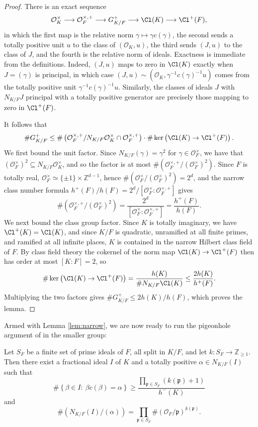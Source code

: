 \begin{proof}
There is an exact sequence
\[
   \mathcal{O}_K^\times\longrightarrow \mathcal{O}_F^{\times,+}\longrightarrow G_{K/F}^+
   \longrightarrow \Cl(K)\longrightarrow \Cl^+(F),
\]
in which the first map is the relative norm $\gamma\mapsto\gamma c(\gamma)$, the second sends a totally positive unit $u$ to the class of $(\mathcal{O}_K,u)$, the third sends $(J,u)$ to the class of $J$, and the fourth is the relative norm of ideals.  Exactness is immediate from the definitions.  Indeed, $(J,u)$ maps to zero in $\Cl(K)$ exactly when $J=(\gamma)$ is principal, in which case $(J,u)\sim(\mathcal{O}_K,\gamma^{-1}c(\gamma)^{-1}u)$ comes from the totally positive unit $\gamma^{-1}c(\gamma)^{-1}u$.  Similarly, the classes of ideals $J$ with $N_{K/F}J$ principal with a totally positive generator are precisely those mapping to zero in $\Cl^+(F)$.

It follows that
\[
   \#G^+_{K/F}
   \leq
   \#\left(\mathcal{O}_F^{\times,+}/N_{K/F}\mathcal{O}_K^\times\cap\mathcal{O}_F^{\times,+}\right)
   \cdot
   \#\ker\left(\Cl(K)\to\Cl^+(F)\right).
\]
We first bound the unit factor.  Since $N_{K/F}(\gamma)=\gamma^2$ for $\gamma\in\mathcal{O}_F^\times$, we have that $(\mathcal{O}_F^\times)^2\subseteq N_{K/F}\mathcal{O}_K^\times$, and so the factor is at most $\#\left(\mathcal{O}_F^{\times,+}/(\mathcal{O}_F^\times)^2\right)$.  Since $F$ is totally real, $\mathcal{O}_F^\times\simeq\{\pm1\}\times\mathbb{Z}^{d-1}$, hence $\#\left(\mathcal{O}_F^\times/(\mathcal{O}_F^\times)^2\right)=2^d$, and the narrow class number formula $h^+(F)/h(F)=2^d/[\mathcal{O}_F^\times:\mathcal{O}_F^{\times,+}]$ gives
\[
   \#\left(\mathcal{O}_F^{\times,+}/(\mathcal{O}_F^\times)^2\right)
   =\frac{2^d}{[\mathcal{O}_F^\times:\mathcal{O}_F^{\times,+}]}
   =\frac{h^+(F)}{h(F)}.
\]
We next bound the class group factor.  Since $K$ is totally imaginary, we have $\Cl^+(K)=\Cl(K)$, and since $K/F$ is quadratic, unramified at all finite primes, and ramified at all infinite places, $K$ is contained in the narrow Hilbert class field of $F$.  By class field theory the cokernel of the norm map $\Cl(K)\to\Cl^+(F)$ then has order at most $[K:F]=2$, so
\[
   \#\ker\left(\Cl(K)\to\Cl^+(F)\right)
   =\frac{h(K)}{\#N_{K/F}\Cl(K)}
   \leq\frac{2h(K)}{h^+(F)}.
\]
Multiplying the two factors gives $\#G^+_{K/F}\leq 2h(K)/h(F)$, which proves the lemma.
\end{proof}

Armed with Lemma \ref{lem:narrow}, we are now ready to run the pigeonhole argument of \cite[Lemma 7]{Sawin} in the smaller group:
\begin{proposition}\label{lem:pigeonhole}
Let $S_F$ be a finite set of prime ideals of $F$, all split in $K/F$, and let $k:S_F\to\mathbb{Z}_{\geq1}$.  Then there exist a fractional ideal $I$ of $K$ and a totally positive $\alpha\in N_{K/F}(I)$ such that
\[
   \#\left\{\beta\in I:\ \beta c(\beta)=\alpha\right\}
   \geq \frac{\prod_{\mathfrak p\in S_F}(k(\mathfrak p)+1)}{h^-(K)}
\]
and
\[
   \#(N_{K/F}(I)/(\alpha))=
   \prod_{\mathfrak p\in S_F}\#(\mathcal{O}_F/\mathfrak p)^{k(\mathfrak p)}.
\]
\end{proposition}

